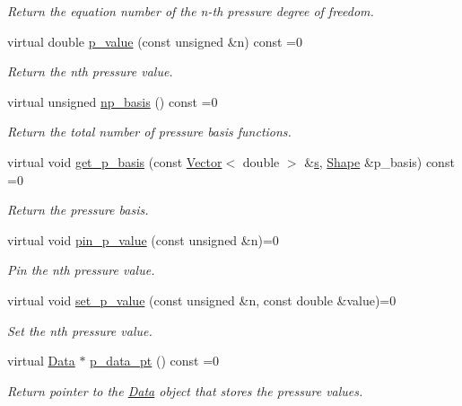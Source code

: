 \begin{DoxyCompactItemize}
\begin{DoxyCompactList}\small\item\em Return the equation number of the n-\/th pressure degree of freedom. \end{DoxyCompactList}\item 
virtual double \hyperlink{classoomph_1_1DarcyEquations_a788824ffa37b4fcae4d45eee75f2c39e}{p\+\_\+value} (const unsigned \&n) const =0
\begin{DoxyCompactList}\small\item\em Return the nth pressure value. \end{DoxyCompactList}\item 
virtual unsigned \hyperlink{classoomph_1_1DarcyEquations_a2a27050f99b0dd3ab6686807fa84f866}{np\+\_\+basis} () const =0
\begin{DoxyCompactList}\small\item\em Return the total number of pressure basis functions. \end{DoxyCompactList}\item 
virtual void \hyperlink{classoomph_1_1DarcyEquations_ab413b560166194e4a9d1b7de4742c5c0}{get\+\_\+p\+\_\+basis} (const \hyperlink{classoomph_1_1Vector}{Vector}$<$ double $>$ \&\hyperlink{cfortran_8h_ab7123126e4885ef647dd9c6e3807a21c}{s}, \hyperlink{classoomph_1_1Shape}{Shape} \&p\+\_\+basis) const =0
\begin{DoxyCompactList}\small\item\em Return the pressure basis. \end{DoxyCompactList}\item 
virtual void \hyperlink{classoomph_1_1DarcyEquations_a93c88bdb79b37be378f5ef4dbe197fa6}{pin\+\_\+p\+\_\+value} (const unsigned \&n)=0
\begin{DoxyCompactList}\small\item\em Pin the nth pressure value. \end{DoxyCompactList}\item 
virtual void \hyperlink{classoomph_1_1DarcyEquations_a7c950999d5108350bd8a44f4ab286b2c}{set\+\_\+p\+\_\+value} (const unsigned \&n, const double \&value)=0
\begin{DoxyCompactList}\small\item\em Set the nth pressure value. \end{DoxyCompactList}\item 
virtual \hyperlink{classoomph_1_1Data}{Data} $\ast$ \hyperlink{classoomph_1_1DarcyEquations_adf8414eb7fe79be0adf62d26e1b361fb}{p\+\_\+data\+\_\+pt} () const =0
\begin{DoxyCompactList}\small\item\em Return pointer to the \hyperlink{classoomph_1_1Data}{Data} object that stores the pressure values. \end{DoxyCompactList}\item 

\end{DoxyCompactItemize}
